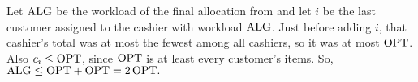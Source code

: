 \documentclass[11pt,addpoints,answers]{exam}
\begin{document}
\begin{questions}
\begin{parts}

    \begin{solution}
    Let \(\text{ALG}\) be the workload of the final allocation from  and let \(i\) be the last customer assigned to the cashier with workload \(\text{ALG}\). Just before adding \(i\), that cashier’s total was at most the fewest among all cashiers, so it was at most \(\text{OPT}\). Also \(c_i \le \text{OPT}\), since \(\text{OPT}\) is at least every customer’s items. So, \(\text{ALG} \le \text{OPT} + \text{OPT} = 2\,\text{OPT}.\)
    \end{solution}
  
  \end{parts}

\end{questions}
\end{document}
